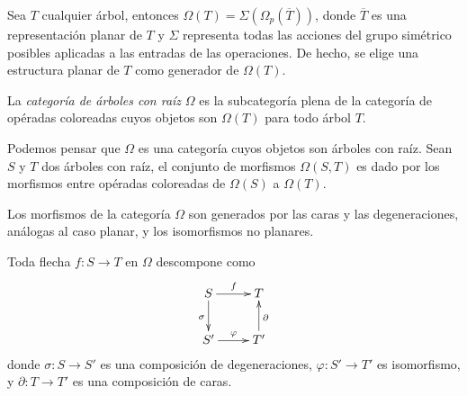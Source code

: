 \documentclass[../main.tex]{subfiles}
\begin{document}
\begin{obs}
    Sea $T$ cualquier \'arbol, entonces $\Omega(T) = \Sigma(\Omega_p(\overline{T}))$, donde $\overline{T}$ es una representaci\'on planar de $T$ y $\Sigma$ representa todas las acciones del grupo sim\'etrico posibles aplicadas a las entradas de las operaciones. De hecho, se elige una estructura planar de $T$ como generador de $\Omega(T)$.
\end{obs}
\begin{defi}
    La \emph{categor\'ia de \'arboles con ra\'iz} $\Omega$ es la subcategor\'ia plena de la categor\'ia de op\'eradas coloreadas cuyos objetos son $\Omega(T)$ para todo \'arbol $T$.

    Podemos pensar que $\Omega$ es una categor\'ia cuyos objetos son \'arboles con ra\'iz.
    Sean $S$ y $T$ dos \'arboles con ra\'iz, el conjunto de morfismos $\Omega(S, T)$ es dado por los morfismos entre op\'eradas coloreadas de $\Omega(S)$ a $\Omega(T)$.
\end{defi}
\begin{obs}
    Los morfismos de la categor\'ia $\Omega$ son generados por las caras y las degeneraciones, an\'alogas al caso planar, y los isomorfismos no planares.
\end{obs}
\begin{lema}
    Toda flecha $f\colon S \to T$ en $\Omega$ descompone como
    $$
        \xymatrix{
            S \ar[d]_{\sigma} \ar[r]^f
            &T \\
            S' \ar[r]^\varphi
            &T' \ar[u]_\partial
        }
    $$
    donde  $\sigma\colon S\to S'$ es una composici\'on de degeneraciones, $\varphi\colon S'\to T'$ es isomorfismo, y $\partial\colon T\to T'$ es una composici\'on de caras.
\end{lema}
\end{document}
